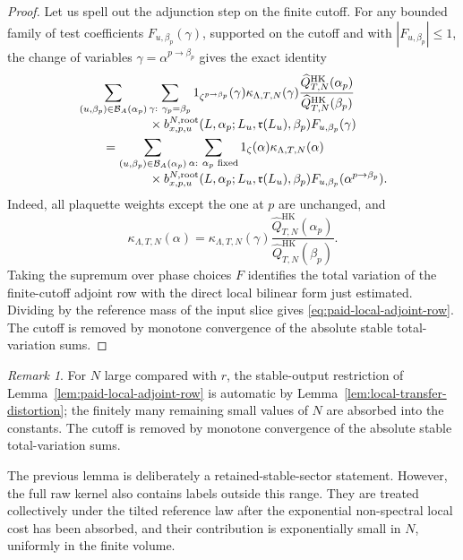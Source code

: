 \documentclass[11pt,a4paper,reqno]{amsart}
\theoremstyle{definition}
\theoremstyle{remark}
\newtheorem{remark}[theorem]{Remark}
\newcommand\HK{{\mathrm{HK}}}
\begin{document}
\begin{proof}
Let us spell out the adjunction step on the finite cutoff.  For any bounded family of test coefficients $F_{u,\beta_p}(\gamma)$, supported on the cutoff and with $|F_{u,\beta_p}|\le1$, the change of variables $\gamma=\alpha^{p\to\beta_p}$ gives the exact identity
\begin{align}\label{eq:finite-cutoff-adjunction}
&\sum_{(u,\beta_p)\in\mathcal B_A(\alpha_p)}
\sum_{\substack{\gamma:\ \gamma_p=\beta_p}}
1_{\zeta^{p\to\beta_p}}(\gamma)
\kappa_{\Lambda,T,N}(\gamma)
\frac{\widehat Q^\HK_{T,N}(\alpha_p)}
{\widehat Q^\HK_{T,N}(\beta_p)}
\notag\\[-1mm]
&\hspace{2cm}\times
b^{N,\mathrm{root}}_{x,p,u}
(L,\alpha_p;L_u,\mathfrak r(L_u),\beta_p)
F_{u,\beta_p}(\gamma)
\notag\\
&\qquad=
\sum_{(u,\beta_p)\in\mathcal B_A(\alpha_p)}
\sum_{\substack{\alpha:\ \alpha_p\text{ fixed}}}
1_\zeta(\alpha)\kappa_{\Lambda,T,N}(\alpha)
\notag\\[-1mm]
&\hspace{2cm}\times
b^{N,\mathrm{root}}_{x,p,u}
(L,\alpha_p;L_u,\mathfrak r(L_u),\beta_p)
F_{u,\beta_p}(\alpha^{p\to\beta_p}).
\end{align}
Indeed, all plaquette weights except the one at $p$ are unchanged, and
\[
\kappa_{\Lambda,T,N}(\alpha)
=
\kappa_{\Lambda,T,N}(\gamma)
\frac{\widehat Q^\HK_{T,N}(\alpha_p)}{\widehat Q^\HK_{T,N}(\beta_p)}.
\]
Taking the supremum over phase choices $F$ identifies the total variation of the finite-cutoff adjoint row with the direct local bilinear form just estimated.  Dividing by the reference mass of the input slice gives \eqref{eq:paid-local-adjoint-row}.  The cutoff is removed by monotone convergence of the absolute stable total-variation sums.
\end{proof}

\begin{remark}
For $N$ large compared with $r$, the stable-output restriction of Lemma~\ref{lem:paid-local-adjoint-row} is automatic by Lemma~\ref{lem:local-transfer-distortion}; the finitely many remaining small values of $N$ are absorbed into the constants. The cutoff is removed by monotone convergence of the absolute stable total-variation sums.
\end{remark}

The previous lemma is deliberately a retained-stable-sector statement. However, the full raw kernel also contains labels outside this range. They are treated collectively under the tilted reference law after the exponential non-spectral local cost has been absorbed, and their contribution is exponentially small in $N$, uniformly in the finite volume.
\end{document}
